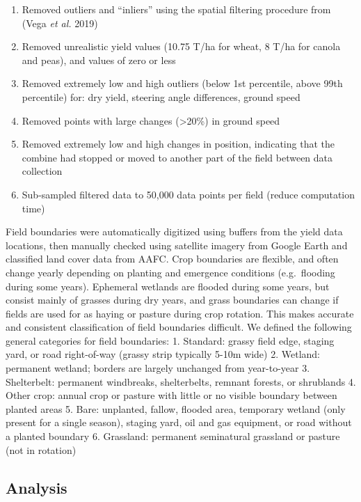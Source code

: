 \documentclass[]{elsarticle} %
\providecommand{\tightlist}{%
  \setlength{\itemsep}{0pt}\setlength{\parskip}{0pt}}
\begin{document}
\begin{enumerate}
\def\labelenumi{\arabic{enumi}.}
\tightlist
\item
  Removed outliers and ``inliers'' using the spatial filtering procedure from (Vega \emph{et al.} 2019)
\item
  Removed unrealistic yield values (10.75 T/ha for wheat, 8 T/ha for canola and peas), and values of zero or less
\item
  Removed extremely low and high outliers (below 1st percentile, above 99th percentile) for: dry yield, steering angle differences, ground speed
\item
  Removed points with large changes (\textgreater20\%) in ground speed
\item
  Removed extremely low and high changes in position, indicating that the combine had stopped or moved to another part of the field between data collection
\item
  Sub-sampled filtered data to 50,000 data points per field (reduce computation time)
\end{enumerate}

Field boundaries were automatically digitized using buffers from the yield data locations, then manually checked using satellite imagery from Google Earth and classified land cover data from AAFC.
Crop boundaries are flexible, and often change yearly depending on planting and emergence conditions (e.g.~flooding during some years).
Ephemeral wetlands are flooded during some years, but consist mainly of grasses during dry years, and grass boundaries can change if fields are used for as haying or pasture during crop rotation.
This makes accurate and consistent classification of field boundaries difficult.
We defined the following general categories for field boundaries:
1. Standard: grassy field edge, staging yard, or road right-of-way (grassy strip typically 5-10m wide)
2. Wetland: permanent wetland; borders are largely unchanged from year-to-year
3. Shelterbelt: permanent windbreaks, shelterbelts, remnant forests, or shrublands
4. Other crop: annual crop or pasture with little or no visible boundary between planted areas
5. Bare: unplanted, fallow, flooded area, temporary wetland (only present for a single season), staging yard, oil and gas equipment, or road without a planted boundary
6. Grassland: permanent seminatural grassland or pasture (not in rotation)

\hypertarget{analysis}{%
\subsection{Analysis}\label{analysis}}
\end{document}

